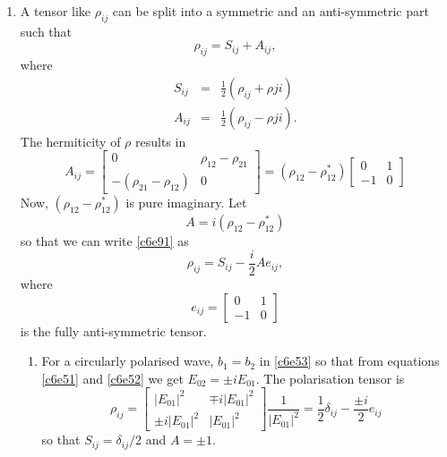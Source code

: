 \begin{enumerate}
\item A tensor like $\rho_{ij}$ can be split into a symmetric and an anti-symmetric
part such that
\begin{equation}\label{c6e91}
\rho_{ij} = S_{ij} + A_{ij},
\end{equation}
where
\begin{eqnarray}
S_{ij} &=& \frac{1}{2}(\rho_{ij} + \rho{ji}) \label{c6e92} \\
A_{ij} &=& \frac{1}{2}(\rho_{ij} - \rho{ji}). \label{c6e93}
\end{eqnarray} 
The hermiticity of $\rho$ results in 
\begin{equation}\label{c6e94}
A_{ij} = \begin{bmatrix}0 & \rho_{12} - \rho_{21} \\
-(\rho_{21} - \rho_{12}) & 0
\end{bmatrix} = (\rho_{12} - \rho_{12}^\ast)\begin{bmatrix}0 & 1 \\ -1 & 0 \end{bmatrix}
\end{equation}
Now, $(\rho_{12} - \rho_{12}^\ast)$ is pure imaginary. Let 
\begin{equation}\label{c6e95}
A = i(\rho_{12} - \rho_{12}^\ast)
\end{equation}
so that we can write \eqref{c6e91} as
\begin{equation}\label{c6e96}
\rho_{ij} = S_{ij} - \frac{i}{2}Ae_{ij},
\end{equation}
where
\begin{equation}\label{c6e97}
e_{ij} = \begin{bmatrix}0 & 1 \\ -1 & 0 \end{bmatrix}
\end{equation}
is the fully anti-symmetric tensor.
\begin{enumerate}
\item For a circularly polarised wave, $b_1 = b_2$ in \eqref{c6e53} so that from
equations \eqref{c6e51} and \eqref{c6e52} we get $E_{02} = \pm i E_{01}$. The 
polarisation tensor is
\begin{equation}\label{c6e98}
\rho_{ij} = \begin{bmatrix}|E_{01}|^2 & \mp i |E_{01}|^2 \\
\pm i |E_{01}|^2 & |E_{01}|^2
\end{bmatrix}\frac{1}{|E_{01}|^2} = \frac{1}{2}\delta_{ij} - \frac{\pm i}{2}e_{ij}
\end{equation}
so that $S_{ij} = \delta_{ij}/2$ and $A = \pm 1$.


\end{enumerate}
\end{enumerate}
